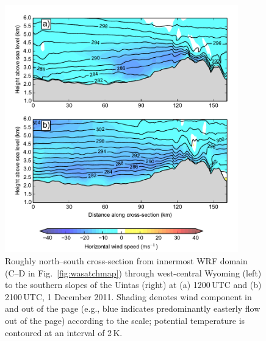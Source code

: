 \documentclass[pdftex,12pt]{article}
\begin{document}
\begin{figure}[t]
   \centering
\includegraphics[width=0.9\textwidth]{yes_xs_northsouth_perpwind.pdf}
   \caption{Roughly north--south cross-section from innermost WRF domain (C--D in Fig.~\ref{fig:wasatchmap}) through west-central Wyoming (left) to the southern slopes of the Uintas (right) at (a) 1200\,UTC and (b) 2100\,UTC, 1 December 2011. Shading denotes wind component in and out of the page (e.g., blue indicates predominantly easterly flow out of the page) according to the scale; potential temperature is contoured at an interval of 2\,K.}
   \label{fig:normxswu}
\end{figure}
\end{document}
